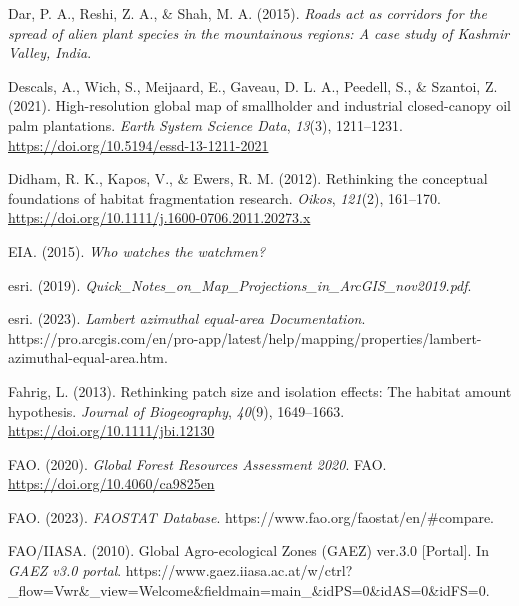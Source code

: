 \documentclass[
  letterpaper,
  DIV=11,
  numbers=noendperiod]{scrreprt}
\newlength{\cslhangindent}
\newlength{\cslentryspacingunit} %
\newenvironment{CSLReferences}[2] %
 {%
  \setlength{\parindent}{0pt}
  \ifodd #1
  \let\oldpar\par
  \def\par{\hangindent=\cslhangindent\oldpar}
  \fi
  \setlength{\parskip}{#2\cslentryspacingunit}
 }%
 {}
\begin{document}
\begin{CSLReferences}{1}{0}
\leavevmode{}%
Dar, P. A., Reshi, Z. A., \& Shah, M. A. (2015). \emph{Roads act as
corridors for the spread of alien plant species in the mountainous
regions: {A} case study of {Kashmir Valley}, {India}}.

\leavevmode{}%
Descals, A., Wich, S., Meijaard, E., Gaveau, D. L. A., Peedell, S., \&
Szantoi, Z. (2021). High-resolution global map of smallholder and
industrial closed-canopy oil palm plantations. \emph{Earth System
Science Data}, \emph{13}(3), 1211--1231.
\url{https://doi.org/10.5194/essd-13-1211-2021}

\leavevmode{}%
Didham, R. K., Kapos, V., \& Ewers, R. M. (2012). Rethinking the
conceptual foundations of habitat fragmentation research. \emph{Oikos},
\emph{121}(2), 161--170.
\url{https://doi.org/10.1111/j.1600-0706.2011.20273.x}

\leavevmode{}%
EIA. (2015). \emph{Who watches the watchmen?}

\leavevmode{}%
esri. (2019).
\emph{Quick\_{Notes}\_on\_{Map}\_{Projections}\_in\_{ArcGIS}\_nov2019.pdf}.

\leavevmode{}%
esri. (2023). \emph{Lambert azimuthal
equal-area \textbar{} {Documentation}}.
https://pro.arcgis.com/en/pro-app/latest/help/mapping/properties/lambert-azimuthal-equal-area.htm.

\leavevmode{}%
Fahrig, L. (2013). Rethinking patch size and isolation effects: The
habitat amount hypothesis. \emph{Journal of Biogeography}, \emph{40}(9),
1649--1663. \url{https://doi.org/10.1111/jbi.12130}

\leavevmode{}%
FAO. (2020). \emph{Global {Forest Resources Assessment} 2020}. {FAO}.
\url{https://doi.org/10.4060/ca9825en}

\leavevmode{}%
FAO. (2023). \emph{{FAOSTAT Database}}.
https://www.fao.org/faostat/en/\#compare.

\leavevmode{}%
FAO/IIASA. (2010). Global {Agro-ecological Zones} ({GAEZ}) ver.3.0
{[}Portal{]}. In \emph{GAEZ v3.0 portal}.
https://www.gaez.iiasa.ac.at/w/ctrl?\_flow=Vwr\&\_view=Welcome\&fieldmain=main\_\&idPS=0\&idAS=0\&idFS=0.


\end{CSLReferences}
\end{document}
